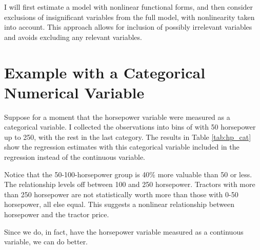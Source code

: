 \documentclass[11pt]{paper}
\begin{document}
I will first estimate a model with nonlinear functional forms, and then consider exclusions of insignificant variables from the full model, with nonlinearity taken into account. 
This approach allows for inclusion of possibly irrelevant variables and avoids excluding any relevant variables. 




\section{Example with a Categorical Numerical Variable}


Suppose for a moment that the horsepower variable were measured
as a categorical variable.
I collected the observations into bins of with 50 horsepower
up to 250, with the rest in the last category.
The results in Table \ref{tab:hp_cat}
show the regression estimates with this categorical variable
included in the regression instead of the continuous variable.



Notice that the 50-100-horsepower group is 40\% more valuable
than 50 or less.
The relationship levels off between 100 and 250 horsepower.
Tractors with more than 250 horsepower are not statistically
worth more than those with 0-50 horsepower, all else equal.
This suggests a nonlinear relationship between horsepower and
the tractor price. 

Since we do, in fact, 
have the horsepower variable
measured as a continuous variable, we can do better.




%
%
%
%
%
%
\end{document}
